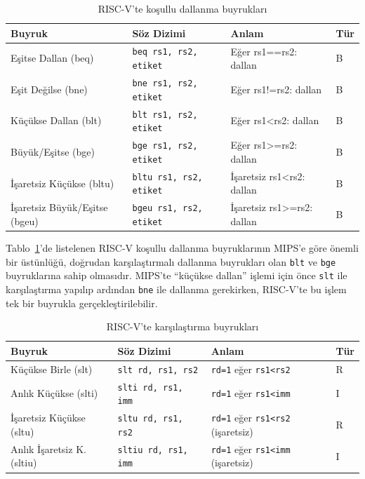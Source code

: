 \begin{table}[H]
\centering
\caption{RISC-V'te koşullu dallanma buyrukları}
\label{tab:dallanma-buyruklar}
\small
\begin{tabular}{llll}
\toprule
\textbf{Buyruk} & \textbf{Söz Dizimi} & \textbf{Anlam} & \textbf{Tür} \\
\midrule
Eşitse Dallan (beq)     & \texttt{beq rs1, rs2, etiket}  & Eğer rs1==rs2: dallan  & B \\
Eşit Değilse (bne)      & \texttt{bne rs1, rs2, etiket}  & Eğer rs1!=rs2: dallan  & B \\
Küçükse Dallan (blt)    & \texttt{blt rs1, rs2, etiket}  & Eğer rs1<rs2: dallan   & B \\
Büyük/Eşitse (bge)      & \texttt{bge rs1, rs2, etiket}  & Eğer rs1>=rs2: dallan  & B \\
İşaretsiz Küçükse (bltu) & \texttt{bltu rs1, rs2, etiket} & İşaretsiz rs1<rs2: dallan & B \\
İşaretsiz Büyük/Eşitse (bgeu) & \texttt{bgeu rs1, rs2, etiket} & İşaretsiz rs1>=rs2: dallan & B \\
\bottomrule
\end{tabular}
\end{table}

Tablo~\ref{tab:dallanma-buyruklar}'de listelenen RISC-V koşullu dallanma buyruklarının MIPS'e göre önemli bir üstünlüğü, doğrudan karşılaştırmalı dallanma buyrukları olan \texttt{blt} ve \texttt{bge} buyruklarına sahip olmasıdır. MIPS'te ``küçükse dallan'' işlemi için önce \texttt{slt} ile karşılaştırma yapılıp ardından \texttt{bne} ile dallanma gerekirken, RISC-V'te bu işlem tek bir buyrukla gerçekleştirilebilir.

\begin{table}[H]
\centering
\caption{RISC-V'te karşılaştırma buyrukları}
\label{tab:karsilastirma-buyruklar}
\begin{tabular}{llll}
\toprule
\textbf{Buyruk} & \textbf{Söz Dizimi} & \textbf{Anlam} & \textbf{Tür} \\
\midrule
Küçükse Birle (slt)  & \texttt{slt rd, rs1, rs2}  & \texttt{rd=1} eğer \texttt{rs1<rs2}  & R \\
Anlık Küçükse (slti) & \texttt{slti rd, rs1, imm} & \texttt{rd=1} eğer \texttt{rs1<imm}  & I \\
İşaretsiz Küçükse (sltu) & \texttt{sltu rd, rs1, rs2} & \texttt{rd=1} eğer \texttt{rs1<rs2} (işaretsiz) & R \\
Anlık İşaretsiz K. (sltiu) & \texttt{sltiu rd, rs1, imm} & \texttt{rd=1} eğer \texttt{rs1<imm} (işaretsiz) & I \\
\bottomrule
\end{tabular}
\end{table}

